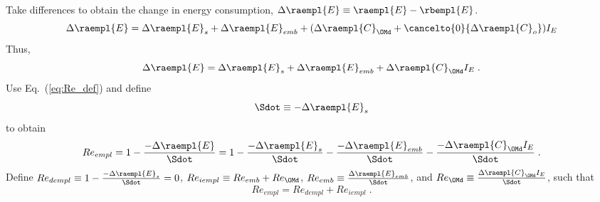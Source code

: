 \begin{landscape}
{Take differences to obtain the change in energy consumption, $\Delta \raempl{E} \equiv \raempl{E} - \rbempl{E}$.
%
\begin{equation}
  \Delta \raempl{E} = \Delta \raempl{E}_s
                      + \Delta \raempl{E}_{emb}
                      + (\Delta \raempl{C}_{\OMd}
                      + \cancelto{0}{\Delta \raempl{C}_o}) I_E
\end{equation}
%
Thus, 
%
\begin{equation}
\Delta \raempl{E} = \Delta \raempl{E}_s + \Delta \raempl{E}_{emb} + \Delta \raempl{C}_{\OMd} I_E \; .
\end{equation}
%
Use Eq.~(\ref{eq:Re_def}) and define
%
\begin{equation} \label{eq:Sdot_def}
\Sdot \equiv -\Delta \raempl{E}_s
\end{equation}
%
to obtain
%
\begin{equation}
Re_{empl} = 1 - \frac{-\Delta \raempl{E}}{\Sdot} 
          = 1 - \frac{-\Delta \raempl{E}_s}{\Sdot} 
              - \frac{-\Delta \raempl{E}_{emb}}{\Sdot}
              - \frac{-\Delta \raempl{C}_{\OMd} I_E}{\Sdot} \; .
\end{equation}
%
Define $Re_{dempl} \equiv 1 - \frac{-\Delta \raempl{E}_s}{\Sdot} = 0$, 
$Re_{iempl} \equiv Re_{emb} + Re_{\OMd}$, 
$Re_{emb} \equiv \frac{\Delta \raempl{E}_{emb}}{\Sdot}$, and
$Re_{\OMd} \equiv \frac{\Delta \raempl{C}_{\OMd} I_E}{\Sdot}$, 
such that
%
\begin{equation}
Re_{empl} = Re_{dempl} + Re_{iempl} \; .
\end{equation}
}
{
~
    
}
\end{landscape}
